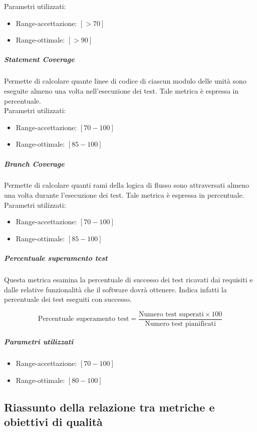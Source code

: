 {  Parametri utilizzati:
  \begin{itemize}
  \item Range-accettazione: $[>70]$
  \item Range-ottimale: $[>90]$\\
  \end{itemize}



  \subparagraph{Statement Coverage}
  Permette di calcolare quante linee di codice di ciascun modulo delle unità sono eseguite almeno
  una volta nell'esecuzione dei test. Tale metrica è espressa in percentuale.\\

  Parametri utilizzati:
  \begin{itemize}
  \item Range-accettazione: $[70 - 100]$
  \item Range-ottimale: $[85 - 100]$
  \end{itemize}

  \subparagraph{Branch Coverage}
  Permette di calcolare quanti rami della logica di flusso sono attraversati almeno una volta durante
  l'esecuzione dei test. Tale metrica è espressa in percentuale.\\

  Parametri utilizzati:
  \begin{itemize}
  \item Range-accettazione: $[70 - 100]$
  \item Range-ottimale: $[85 - 100]$
  \end{itemize}

  \subparagraph{Percentuale superamento test}
Questa metrica esamina la percentuale di successo dei test ricavati dai requisiti e dalle relative
funzionalità che il software dovrà ottenere. Indica infatti la percentuale dei test eseguiti con
successo.

$$
\text{Percentuale superamento test} = 
\frac{\text{Numero test superati} \times 100}
{\text{Numero test pianificati}}
$$

\subparagraph{Parametri utilizzati}
\begin{itemize}
	\item Range-accettazione: $[70 - 100]$
	\item Range-ottimale: $[80 - 100]$
\end{itemize}

\subsection{Riassunto della relazione tra metriche e obiettivi di qualità}

}
